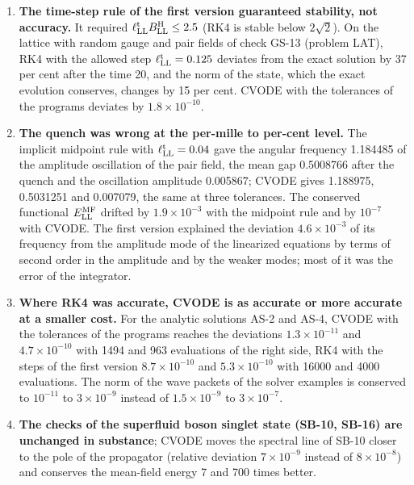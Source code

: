 \documentclass[
  10pt,
]{article}
\providecommand{\tightlist}{%
  \setlength{\itemsep}{0pt}\setlength{\parskip}{0pt}}
\begin{document}
\begin{enumerate}
\def\labelenumi{\arabic{enumi}.}
\tightlist
\item
  \textbf{The time-step rule of the first version guaranteed stability,
  not accuracy.} It required
  \(\ell^{\rm t}_{\rm LL}B^{\rm H}_{\rm LL}\le2.5\) (RK4 is stable below
  \(2\sqrt2\)). On the lattice with random gauge and pair fields of
  check GS-13 (problem LAT), RK4 with the allowed step
  \(\ell^{\rm t}_{\rm LL}=0.125\) deviates from the exact solution by 37
  per cent after the time 20, and the norm of the state, which the exact
  evolution conserves, changes by 15 per cent. CVODE with the tolerances
  of the programs deviates by \(1.8\times10^{-10}\).
\item
  \textbf{The quench was wrong at the per-mille to per-cent level.} The
  implicit midpoint rule with \(\ell^{\rm t}_{\rm LL}=0.04\) gave the
  angular frequency 1.184485 of the amplitude oscillation of the pair
  field, the mean gap 0.5008766 after the quench and the oscillation
  amplitude 0.005867; CVODE gives 1.188975, 0.5031251 and 0.007079, the
  same at three tolerances. The conserved functional
  \(E^{\rm MF}_{\rm LL}\) drifted by \(1.9\times10^{-3}\) with the
  midpoint rule and by \(10^{-7}\) with CVODE. The first version
  explained the deviation \(4.6\times10^{-3}\) of its frequency from the
  amplitude mode of the linearized equations by terms of second order in
  the amplitude and by the weaker modes; most of it was the error of the
  integrator.
\item
  \textbf{Where RK4 was accurate, CVODE is as accurate or more accurate
  at a smaller cost.} For the analytic solutions AS-2 and AS-4, CVODE
  with the tolerances of the programs reaches the deviations
  \(1.3\times10^{-11}\) and \(4.7\times10^{-10}\) with 1494 and 963
  evaluations of the right side, RK4 with the steps of the first version
  \(8.7\times10^{-10}\) and \(5.3\times10^{-10}\) with 16000 and 4000
  evaluations. The norm of the wave packets of the solver examples is
  conserved to \(10^{-11}\) to \(3\times10^{-9}\) instead of
  \(1.5\times10^{-9}\) to \(3\times10^{-7}\).
\item
  \textbf{The checks of the superfluid boson singlet state (SB-10,
  SB-16) are unchanged in substance}; CVODE moves the spectral line of
  SB-10 closer to the pole of the propagator (relative deviation
  \(7\times10^{-9}\) instead of \(8\times10^{-8}\)) and conserves the
  mean-field energy 7 and 700 times better.
\end{enumerate}
\end{document}
